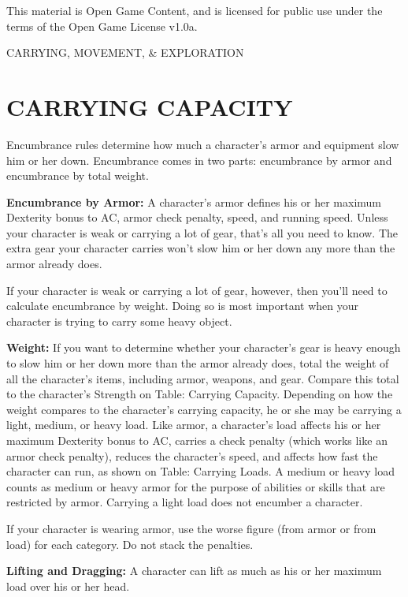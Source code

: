 \documentclass{article}
\begin{document}
This material is Open Game Content, and is licensed for public use under the terms 
of the Open Game License v1.0a.

{\LARGE{}CARRYING, MOVEMENT, \& EXPLORATION}

\vspace{12pt}
\section*{{\LARGE{}CARRYING CAPACITY}}

Encumbrance rules determine how much a character's armor and equipment slow him 
or her down. Encumbrance comes in two parts: encumbrance by armor and encumbrance 
by total weight.

\textbf{Encumbrance by Armor:} A character's armor defines his or her maximum Dexterity 
bonus to AC, armor check penalty, speed, and running speed. Unless your character 
is weak or carrying a lot of gear, that's all you need to know. The extra gear 
your character carries won't slow him or her down any more than the armor already 
does.

If your character is weak or carrying a lot of gear, however, then you'll need 
to calculate encumbrance by weight. Doing so is most important when your character 
is trying to carry some heavy object.

\textbf{Weight:} If you want to determine whether your character's gear is heavy 
enough to slow him or her down more than the armor already does, total the weight 
of all the character's items, including armor, weapons, and gear. Compare this 
total to the character's Strength on Table: Carrying Capacity. Depending on how 
the weight compares to the character's carrying capacity, he or she may be carrying 
a light, medium, or heavy load. Like armor, a character's load affects his or her 
maximum Dexterity bonus to AC, carries a check penalty (which works like an armor 
check penalty), reduces the character's speed, and affects how fast the character 
can run, as shown on Table: Carrying Loads. A medium or heavy load counts as medium 
or heavy armor for the purpose of abilities or skills that are restricted by armor. 
Carrying a light load does not encumber a character.

If your character is wearing armor, use the worse figure (from armor or from load) 
for each category. Do not stack the penalties.

\textbf{Lifting and Dragging:} A character can lift as much as his or her maximum 
load over his or her head.
\end{document}
